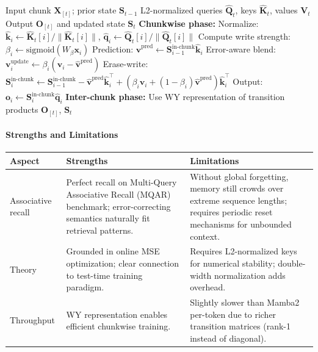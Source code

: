 \begin{algorithm}[H]
\caption{DeltaNet State Update with WY Representation}
\begin{algorithmic}[1]
\Require Input chunk $\mathbf{X}_{[t]}$; prior state $\mathbf{S}_{t-1}$
\Require L2-normalized queries $\hat{\mathbf{Q}}_t$, keys $\hat{\mathbf{K}}_t$, values $\mathbf{V}_t$
\Ensure Output $\mathbf{O}_{[t]}$ and updated state $\mathbf{S}_t$
\State \textbf{Chunkwise phase:}
    \State Normalize: $\hat{\mathbf{k}}_i \gets \hat{\mathbf{K}}_t[i] / \|\hat{\mathbf{K}}_t[i]\|$, $\hat{\mathbf{q}}_i \gets \hat{\mathbf{Q}}_t[i] / \|\hat{\mathbf{Q}}_t[i]\|$
    \State Compute write strength: $\beta_i \gets \text{sigmoid}(W_\beta \mathbf{x}_i)$
    \State Prediction: $\hat{\mathbf{v}}^\text{pred} \gets \mathbf{S}_{i-1}^\text{in-chunk} \hat{\mathbf{k}}_i$
    \State Error-aware blend: $\mathbf{v}_i^\text{update} \gets \beta_i(\mathbf{v}_i - \hat{\mathbf{v}}^\text{pred})$
    \State Erase-write: $\mathbf{S}_i^\text{in-chunk} \gets \mathbf{S}_{i-1}^\text{in-chunk} - \hat{\mathbf{v}}^\text{pred}\hat{\mathbf{k}}_i^\top + (\beta_i \mathbf{v}_i + (1-\beta_i)\hat{\mathbf{v}}^\text{pred})\hat{\mathbf{k}}_i^\top$
    \State Output: $\mathbf{o}_i \gets \mathbf{S}_i^\text{in-chunk} \hat{\mathbf{q}}_i$
\EndFor
\State \textbf{Inter-chunk phase:} Use WY representation of transition products
\Return $\mathbf{O}_{[t]}$, $\mathbf{S}_{t}$
\end{algorithmic}
\end{algorithm}

\paragraph{Strengths and Limitations}

\begin{table}[H]
\centering
\small
\begin{tabularx}{0.95\linewidth}{Xp{4cm}p{4cm}}
\toprule
\textbf{Aspect} & \textbf{Strengths} & \textbf{Limitations} \\
\midrule
Associative recall & Perfect recall on Multi-Query Associative Recall (MQAR) benchmark; error-correcting semantics naturally fit retrieval patterns. & Without global forgetting, memory still crowds over extreme sequence lengths; requires periodic reset mechanisms for unbounded context. \\
Theory & Grounded in online MSE optimization; clear connection to test-time training paradigm. & Requires L2-normalized keys for numerical stability; double-width normalization adds overhead. \\
Throughput & WY representation enables efficient chunkwise training. & Slightly slower than Mamba2 per-token due to richer transition matrices (rank-1 instead of diagonal). \\
\bottomrule
\end{tabularx}
\end{table}

